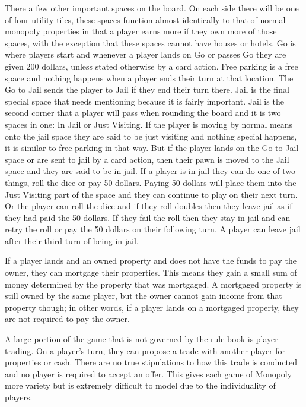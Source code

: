 \documentclass{article}
\begin{document}
There a few other important spaces on the board.  On each side there will be one of four utility tiles, these spaces function almost identically to that of normal monopoly properties in that a player earns more if they own more of those spaces, with the exception that these spaces cannot have houses or hotels.  Go is where players start and whenever a player lands on Go or passes Go they are given 200 dollars, unless stated otherwise by a card action.  Free parking is a free space and nothing happens when a player ends their turn at that location.  The Go to Jail sends the player to Jail if they end their turn there.  Jail is the final special space that needs mentioning because it is fairly important.  Jail is the second corner that a player will pass when rounding the board and it is two spaces in one: In Jail or Just Visiting.  If the player is moving by normal means onto the jail space they are said to be just visiting and nothing special happens, it is similar to free parking in that way. But if the player lands on the Go to Jail space or are sent to jail by a card action, then their pawn is moved to the Jail space and they are said to be in jail.  If a player is in jail they can do one of two things, roll the dice or pay 50 dollars.  Paying 50 dollars will place them into the Just Visiting part of the space and they can continue to play on their next turn.  Or the player can roll the dice and if they roll doubles then they leave jail as if they had paid the 50 dollars.  If they fail the roll then they stay in jail and can retry the roll or pay the 50 dollars on their following turn.  A player can leave jail after their third turn of being in jail.
	
If a player lands and an owned property and does not have the funds to pay the owner, they can mortgage their properties.  This means they gain a small sum of money determined by the property that was mortgaged.  A mortgaged property is still owned by the same player, but the owner cannot gain income from that property though; in other words, if a player lands on a mortgaged property, they are not required to pay the owner.

A large portion of the game that is not governed by the rule book is player trading.  On a player’s turn, they can propose a trade with another player for properties or cash.  There are no true stipulations to how this trade is conducted and no player is required to accept an offer.  This gives each game of Monopoly more variety but is extremely difficult to model due to the individuality of players.
\end{document}
